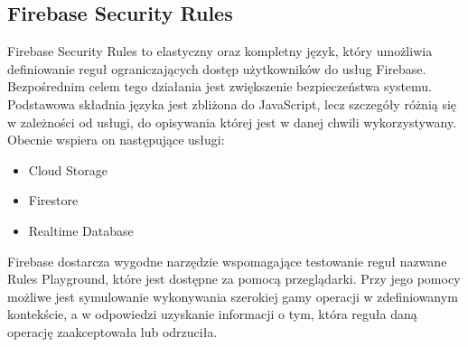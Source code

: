 \subsection{Firebase Security Rules}

Firebase Security Rules to elastyczny oraz kompletny język, który umożliwia definiowanie reguł ograniczających dostęp użytkowników do usług Firebase. Bezpośrednim celem tego działania jest zwiększenie bezpieczeństwa systemu. Podstawowa składnia języka jest zbliżona do JavaScript, lecz szczegóły różnią się w zależności od usługi, do opisywania której jest w danej chwili wykorzystywany. Obecnie wspiera on następujące usługi:

\begin{itemize}
    \item Cloud Storage
    \item Firestore
    \item Realtime Database
\end{itemize}


Firebase dostarcza wygodne narzędzie wspomagające testowanie reguł nazwane Rules Playground, które jest dostępne za pomocą przeglądarki. Przy jego pomocy możliwe jest symulowanie wykonywania szerokiej gamy operacji w zdefiniowanym kontekście, a w odpowiedzi uzyskanie informacji o tym, która reguła daną operację zaakceptowała lub odrzuciła.



